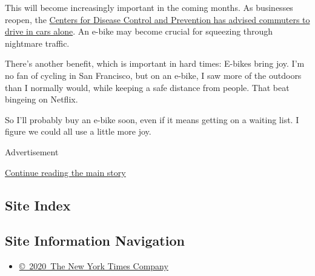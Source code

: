 This will become increasingly important in the coming months. As
businesses reopen, the
\href{https://www.nytimes3xbfgragh.onion/2020/05/28/health/cdc-coronavirus-offices.html}{Centers
for Disease Control and Prevention has advised commuters to drive in
cars alone}. An e-bike may become crucial for squeezing through
nightmare traffic.

There's another benefit, which is important in hard times: E-bikes bring
joy. I'm no fan of cycling in San Francisco, but on an e-bike, I saw
more of the outdoors than I normally would, while keeping a safe
distance from people. That beat bingeing on Netflix.

So I'll probably buy an e-bike soon, even if it means getting on a
waiting list. I figure we could all use a little more joy.

Advertisement

\protect\hyperlink{after-bottom}{Continue reading the main story}

\hypertarget{site-index}{%
\subsection{Site Index}\label{site-index}}

\hypertarget{site-information-navigation}{%
\subsection{Site Information
Navigation}\label{site-information-navigation}}

\begin{itemize}
\tightlist
\item
  \href{https://help.nytimes3xbfgragh.onion/hc/en-us/articles/115014792127-Copyright-notice}{©~2020~The
  New York Times Company}
\end{itemize}

